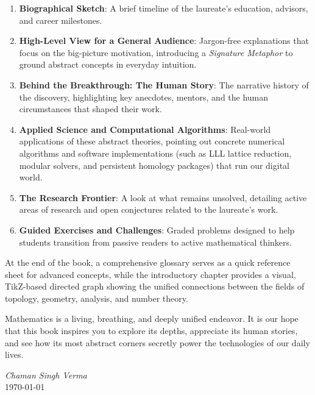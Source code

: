 \begin{enumerate}
    \item \textbf{Biographical Sketch}: A brief timeline of the laureate's education, advisors, and career milestones.
    \item \textbf{High-Level View for a General Audience}: Jargon-free explanations that focus on the big-picture motivation, introducing a \emph{Signature Metaphor} to ground abstract concepts in everyday intuition.
    \item \textbf{Behind the Breakthrough: The Human Story}: The narrative history of the discovery, highlighting key anecdotes, mentors, and the human circumstances that shaped their work.
    \item \textbf{Applied Science and Computational Algorithms}: Real-world applications of these abstract theories, pointing out concrete numerical algorithms and software implementations (such as LLL lattice reduction, modular solvers, and persistent homology packages) that run our digital world.
    \item \textbf{The Research Frontier}: A look at what remains unsolved, detailing active areas of research and open conjectures related to the laureate's work.
    \item \textbf{Guided Exercises and Challenges}: Graded problems designed to help students transition from passive readers to active mathematical thinkers.
\end{enumerate}

At the end of the book, a comprehensive glossary serves as a quick reference sheet for advanced concepts, while the introductory chapter provides a visual, TikZ-based directed graph showing the unified connections between the fields of topology, geometry, analysis, and number theory.

Mathematics is a living, breathing, and deeply unified endeavor. It is our hope that this book inspires you to explore its depths, appreciate its human stories, and see how its most abstract corners secretly power the technologies of our daily lives.

\vspace{1.5cm}
\begin{flushright}
    \emph{Chaman Singh Verma}\\
    \today
\end{flushright}
